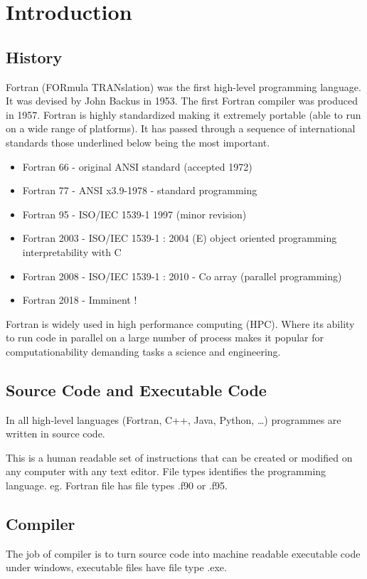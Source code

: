 \documentclass[class=book,crop=false]{standalone}
\begin{document}
\chapter{Introduction}
    \section{History}
    Fortran (FORmula TRANslation) was the first high-level programming language.
    It was devised by John Backus in 1953. 
    The first Fortran compiler was produced in 1957. 
    Fortran is highly standardized making it extremely portable (able to run on a wide range of platforms).
    It has passed through a sequence of international standards those underlined below being the most important.
    \begin{itemize}
        \item Fortran 66 - original ANSI standard (accepted 1972)
        \item Fortran 77 - ANSI x3.9-1978 - standard programming
        \item Fortran 95 - ISO/IEC 1539-1 1997 (minor revision)
        \item Fortran 2003 - ISO/IEC 1539-1 : 2004 (E) object oriented programming interpretability with C
        \item Fortran 2008 - ISO/IEC 1539-1 : 2010 - Co array (parallel programming)
        \item Fortran 2018 - Imminent !
    \end{itemize}
    Fortran is widely used in high performance computing (HPC). Where its ability to run code in parallel on a large number of process makes it popular for computationability demanding tasks a science and engineering.
    \section{Source Code and Executable Code}
    In all high-level languages (Fortran, C++, Java, Python, \dots ) programmes are written in source code.

    This is a human readable set of instructions that can be created or modified on any computer with any text editor. File types identifies the programming language. eg. Fortran file has file types .f90 or .f95.
    \section{Compiler}
    The job of compiler is to turn source code into machine readable executable code under windows, executable files have file type .exe.\\
\end{document}
